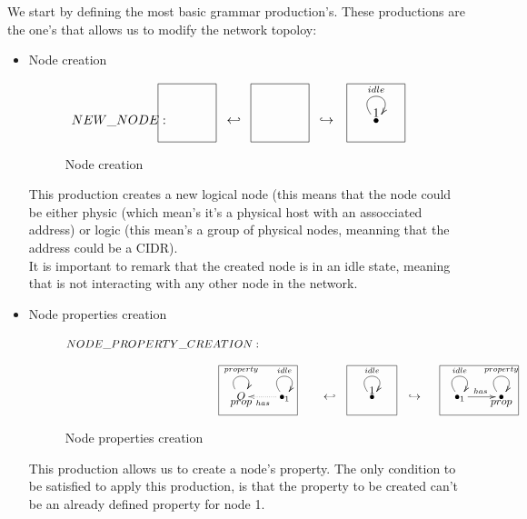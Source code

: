 \documentclass[envcountsect,runningheads]{llncs}
\begin{document}
We start by defining the most basic grammar production's. These 
productions are the one's that allows us to modify the network topoloy:


\begin{itemize}
  \item Node creation
  \begin{figure}[H]
    \[
       \xymatrix@C=25pt@R=16pt
       {
         {}
         \POS[]-<4.5pc,0pc>\drop{NEW\_NODE:}
         \POS[]+<0pc,.5pc> *+=<3.8pc,3.8pc>[F-]{} & {\hookleftarrow} &
         {}
         \POS[]+<0pc,.5pc> *+=<3.8pc,3.8pc>[F-]{} & {\hookrightarrow} &
         {\bullet} \ar@(ul,ur)^{idle}
         \POS[]+<0pc,.5pc> *+=<3.8pc,3.8pc>[F-]{1} &
       }
    \]
    \caption{Node creation}
    \protect\label{fig:nodecreation}
  \end{figure}
  This production creates a new logical node (this means that 
  the node could be either physic (which mean's it's a physical host with an 
  assocciated address) or logic (this mean's a group of physical nodes, meanning
  that the address could be a CIDR). \\
  It is important to remark that the created node is in an idle state, meaning 
  that is not interacting with any other node in the network. \\ 
  
  \item Node properties creation
  \begin{figure}[H]
    \[
       \xymatrix@C=25pt@R=16pt
       {
         {}\POS[]-<6pc,0pc>\drop{NODE\_PROPERTY\_CREATION:}
         \\
         \\
         O \ar@(ul,ur)^{property} \POS[]-<0pc,.5pc>\drop{prop} &
         {\bullet}_{1} \ar@(ul,ur)^{idle} \ar@{.>}^{has}[l]
         \POS[]+<-2pc,.5pc> *+=<6pc,3.8pc>[F-]{} & {\hookleftarrow} &
         {\bullet} \ar@(ul,ur)^{idle}
         \POS[]+<0pc,.5pc> *+=<3.8pc,3.8pc>[F-]{1} & {\hookrightarrow} &
         {\bullet}_{1} \ar@(ul,ur)^{idle} \ar@{->}^{has}[r]
         \POS[]+<1.5pc,.5pc> *+=<6pc,3.8pc>[F-]{} &
         {\bullet} \ar@(ul,ur)^{property} \POS[]-<0pc,.5pc>\drop{prop}
       }
    \]
    \caption{Node properties creation}
    \protect\label{fig:nodecreation}
  \end{figure}
  This production allows us to create a node's property. The only condition to 
  be satisfied to apply this production, is that the property to be created can't be an already
  defined property for node 1.
  

\end{itemize}
\end{document}
